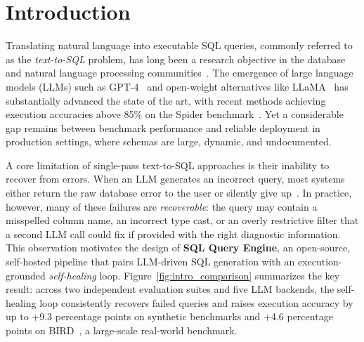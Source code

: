 \documentclass{article}
\begin{document}
\section{Introduction}
\label{sec:introduction}

Translating natural language into executable SQL queries, commonly referred to as the \emph{text-to-SQL} problem, has long been a research objective in the database and natural language processing communities~\citep{zhong2017seq2sql, yu2018spider}. The emergence of large language models (LLMs) such as GPT-4~\citep{openai2023gpt4} and open-weight alternatives like LLaMA~\citep{touvron2023llama} has substantially advanced the state of the art, with recent methods achieving execution accuracies above 85\% on the Spider benchmark~\citep{pourreza2023dinsql, gao2024dailsql}. Yet a considerable gap remains between benchmark performance and reliable deployment in production settings, where schemas are large, dynamic, and undocumented.

A core limitation of single-pass text-to-SQL approaches is their inability to recover from errors. When an LLM generates an incorrect query, most systems either return the raw database error to the user or silently give up~\citep{shi2024survey}. In practice, however, many of these failures are \emph{recoverable}: the query may contain a misspelled column name, an incorrect type cast, or an overly restrictive filter that a second LLM call could fix if provided with the right diagnostic information. This observation motivates the design of \textbf{SQL Query Engine}, an open-source, self-hosted pipeline that pairs LLM-driven SQL generation with an execution-grounded \emph{self-healing} loop. Figure~\ref{fig:intro_comparison} summarizes the key result: across two independent evaluation suites and five LLM backends, the self-healing loop consistently recovers failed queries and raises execution accuracy by up to +9.3 percentage points on synthetic benchmarks and +4.6 percentage points on BIRD~\citep{li2024bird}, a large-scale real-world benchmark.
\end{document}
